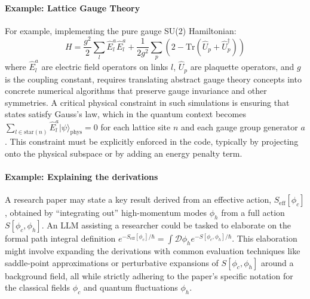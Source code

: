 \paragraph{Example: Lattice Gauge Theory}
For example, implementing the pure gauge SU(2) Hamiltonian:
\begin{equation}
    H = \frac{g^2}{2} \sum_l \hat{E}^a_l \hat{E}^a_l + \frac{1}{2g^2} \sum_p \left(2 - \text{Tr}(\hat{U}_p + \hat{U}_p^\dagger)\right)
\end{equation}
where $\hat{E}^a_l$ are electric field operators on links $l$, $\hat{U}_p$ are plaquette operators, and $g$ is the coupling constant, requires translating abstract gauge theory concepts into concrete numerical algorithms that preserve gauge invariance and other symmetries.
A critical physical constraint in such simulations is ensuring that states satisfy Gauss's law, which in the quantum context becomes $\sum_{l \in \text{star}(n)} \hat{E}^a_l |\psi\rangle_{\text{phys}} = 0$ for each lattice site $n$ and each gauge group generator $a$. This constraint must be explicitly enforced in the code, typically by projecting onto the physical subspace or by adding an energy penalty term.

\paragraph{Example: Explaining the derivations}
A research paper may state a key result derived from an effective action, $S_{\text{eff}}[\phi_c]$, obtained by ``integrating out'' high-momentum modes $\phi_h$ from a full action $S[\phi_c, \phi_h]$. An LLM assisting a researcher could be tasked to elaborate on the formal path integral definition $e^{-S_{\text{eff}}[\phi_c]/\hbar} = \int \mathcal{D}\phi_h e^{-S[\phi_c, \phi_h]/\hbar}$. This elaboration might involve expanding the derivations with common evaluation techniques like saddle-point approximations or perturbative expansions of $S[\phi_c, \phi_h]$ around a background field, all while strictly adhering to the paper's specific notation for the classical fields $\phi_c$ and quantum fluctuations $\phi_h$.


